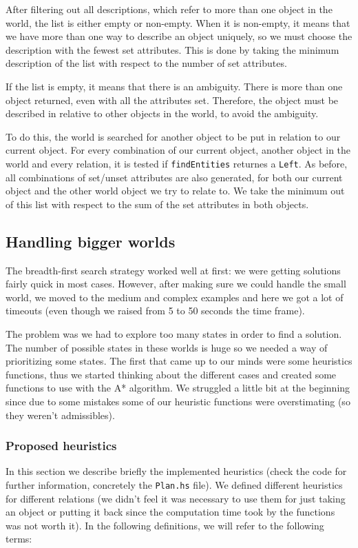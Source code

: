 \documentclass[11pt]{article}
\begin{document}
      After filtering out all descriptions, which refer to more than one object 
      in the world, the list is either empty or non-empty. When it is 
      non-empty, it means that we have more than one way to describe an object 
      uniquely, so we must choose the description with the fewest set 
      attributes. This is done by taking the minimum description of the list 
      with respect to the number of set attributes.

      If the list is empty, it means that there is an ambiguity. There is more 
      than one object returned, even with all the attributes set. Therefore, 
      the object must be described in relative to other objects in the world, 
      to avoid the ambiguity.
      
      To do this, the world is searched for another object to be put in 
      relation to our current object. For every combination of our current 
      object, another object in the world and every relation, it is tested if 
      \texttt{findEntities} returnes a \texttt{Left}.
      As before, all combinations of set/unset attributes are 
      also generated, for both our current object and the other world object 
      we try to relate to. We take the minimum out of this list with respect to 
      the sum of the set attributes in both objects.

        \subsection{Handling bigger worlds}
        The breadth-first search strategy worked well at first: we were getting solutions 
        fairly quick in most cases. However, after making sure we could handle the small 
        world, we moved to the medium and complex examples and here we got a lot of 
        timeouts (even though we raised from 5 to 50 seconds the time frame).

        The problem was we had to explore too many states in order to find a solution. The 
        number of possible states in these worlds is huge so we needed a way of
        prioritizing some states. The first that came up to our minds were some
        heuristics functions, thus we started thinking about the different cases
        and created some functions to use with the A* algorithm. We struggled a little
        bit at the beginning since due to some mistakes some of our heuristic functions
        were overstimating (so they weren't admissibles).
        
        \subsubsection{Proposed heuristics}
        In this section we describe briefly the implemented heuristics (check the code for
         further information, concretely the \texttt{Plan.hs} file). We defined different 
         heuristics for different relations (we didn't feel it was necessary to use them 
         for just taking an object or putting it back since the computation time took by the
         functions was not worth it). In the following definitions, we will refer to the 
         following terms:
\end{document}
